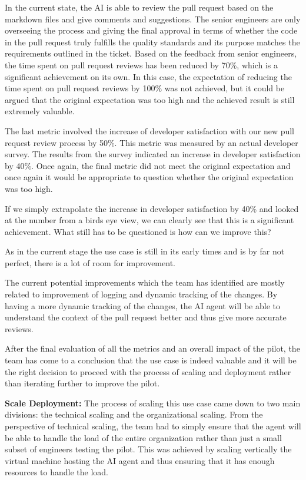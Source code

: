 \documentclass[]{imc-inf}
\begin{document}
	In the current state, the AI is able to review the pull request based on the markdown files and give comments and suggestions. The senior engineers are only overseeing the process and giving the final approval in terms of whether the code in the pull request truly fulfills the quality standards and its purpose matches the requirements outlined in the ticket. Based on the feedback from senior engineers, the time spent on pull request reviews has been reduced by 70\%, which is a significant achievement on its own. In this case, the expectation of reducing the time spent on pull request reviews by 100\% was not achieved, but it could be argued that the original expectation was too high and the achieved result is still extremely valuable.


	The last metric involved the increase of developer satisfaction with our new pull request review process by 50\%. This metric was measured by an actual developer survey. The results from the survey indicated an increase in developer satisfaction by 40\%. Once again, the final metric did not meet the original expectation and once again it would be appropriate to question whether the original expectation was too high.

	If we simply extrapolate the increase in developer satisfaction by 40\% and looked at the number from a birds eye view, we can clearly see that this is a significant achievement. What still has to be questioned is how can we improve this? 

	As in the current stage the use case is still in its early times and is by far not perfect, there is a lot of room for improvement. 

	The current potential improvements which the team has identified are mostly related to improvement of logging and dynamic tracking of the changes. By having a more dynamic tracking of the changes, the AI agent will be able to understand the context of the pull request better and thus give more accurate reviews.

	After the final evaluation of all the metrics and an overall impact of the pilot, the team has come to a conclusion that the use case is indeed valuable and it will be the right decision to proceed with the process of scaling and deployment rather than iterating further to improve the pilot. 

\textbf{Scale Deployment:}
The process of scaling this use case came down to two main divisions: the technical scaling and the organizational scaling. From the perspective of technical scaling, the team had to simply ensure that the agent will be able to handle the load of the entire organization rather than just a small subset of engineers testing the pilot. This was achieved by scaling vertically the virtual machine hosting the AI agent and thus ensuring that it has enough resources to handle the load. 
\end{document}
